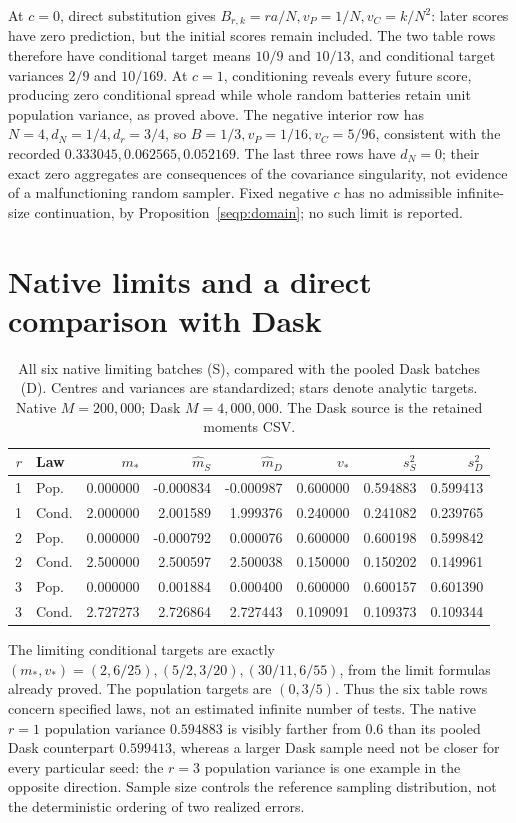At \(c=0\), direct substitution gives
\(B_{r,k}=ra/N,v_P=1/N,v_C=k/N^2\): later scores have zero
prediction, but the initial scores remain included. The two table rows
therefore have conditional target means \(10/9\) and \(10/13\),
and conditional target variances \(2/9\) and \(10/169\).
At \(c=1\), conditioning reveals every future score, producing zero
conditional spread while whole random batteries retain unit population
variance, as proved above. The negative interior row has
\(N=4,d_N=1/4,d_r=3/4\), so
\(B=1/3,v_P=1/16,v_C=5/96\), consistent with the recorded
\(0.333045,0.062565,0.052169\). The last three rows have
\(d_N=0\); their exact zero aggregates are consequences of the
covariance singularity, not evidence of a malfunctioning random sampler.
Fixed negative \(c\) has no admissible infinite-size continuation,
by Proposition~\ref{seqp:domain}; no such limit is reported.

\section{Native limits and a direct comparison with Dask}
\begin{table}[htbp]
\centering\small
\setlength{\tabcolsep}{4pt}
\begin{tabular}{rlrrrrrr}
\toprule
\(r\)&Law&\(m_*\)&\(\widehat m_S\)&\(\widehat m_D\)&\(v_*\)&\(s_S^2\)&\(s_D^2\)\\
\midrule
1&Pop.&0.000000&-0.000834&-0.000987&0.600000&0.594883&0.599413\\
1&Cond.&2.000000&2.001589&1.999376&0.240000&0.241082&0.239765\\
2&Pop.&0.000000&-0.000792&0.000076&0.600000&0.600198&0.599842\\
2&Cond.&2.500000&2.500597&2.500038&0.150000&0.150202&0.149961\\
3&Pop.&0.000000&0.001884&0.000400&0.600000&0.600157&0.601390\\
3&Cond.&2.727273&2.726864&2.727443&0.109091&0.109373&0.109344\\
\bottomrule
\end{tabular}
\caption{All six native limiting batches (S), compared with the pooled
Dask batches (D). Centres and variances are standardized; stars denote
analytic targets. Native \(M=200{,}000\); Dask \(M=4{,}000{,}000\).
The Dask source is the retained moments CSV.}
\label{tab:seq-native-limits}
\end{table}

The limiting conditional targets are exactly
\((m_*,v_*)=(2,6/25),(5/2,3/20),(30/11,6/55)\), from the
limit formulas already proved. The population targets are \((0,3/5)\).
Thus the six table rows concern specified laws, not an estimated
infinite number of tests. The native \(r=1\) population variance
\(0.594883\) is visibly farther from \(0.6\) than its pooled Dask
counterpart \(0.599413\), whereas a larger Dask sample need not be
closer for every particular seed: the \(r=3\) population variance is
one example in the opposite direction. Sample size controls the reference
sampling distribution, not the deterministic ordering of two realized
errors.

